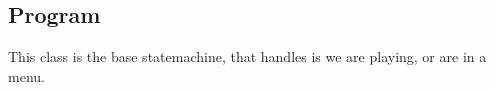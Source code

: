 \subsection{Program}

This class is the base statemachine, that handles is we are playing, or are in a menu. 

